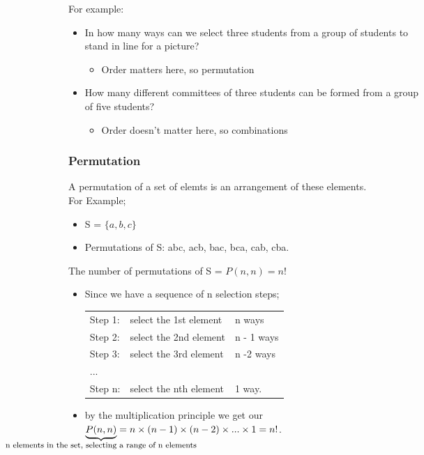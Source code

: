 \documentclass[12pt, letterpaper]{article}
\newcommand{\cul}[1]{%
		\uline{\phantom{#1}}%
		\llap{\contour{white}{#1}}%
	}
\begin{document}
For example: 
\begin{itemize}[leftmargin=*, label={}]
	\item In how many ways  can we select three students from a group of students to stand in line for a picture?
	\begin{itemize}
		\item Order matters here, so permutation
	\end{itemize}
	\item How many different committees of three students can be formed from a group of five students?
	\begin{itemize}
		\item Order doesn't matter here, so combinations
	\end{itemize}
\end{itemize}

\pagebreak

\subsubsection{Permutation}
A permutation of a set of elemts is an \cul{ordered} arrangement of these elements. \\
For Example;
\begin{itemize}[leftmargin=*, label={}]
	\item S = $\{a,b,c\}$
	\item Permutations of S: abc, acb, bac, bca, cab, cba.
\end{itemize}

\bigbreak

The number of permutations of S = $P(n,n) = n!$ 
\begin{itemize}[leftmargin=*, label={}]
	\item Since we have a sequence of n selection steps; \\
	\begin{tabular}{l l l}
		Step 1: & select the 1st element & n ways \\ 
		Step 2: & select the 2nd element & n - 1 ways \\ 
		Step 3: & select the 3rd element & n -2 ways \\
		... & & \\
		Step n: & select the nth element & 1 way. 
	\end{tabular}
	\item by the multiplication principle we get our $\underbrace{P(n,n)}_{\makebox[0pt]{\footnotesize n elements in the set, selecting a range of n elements}} = n \times (n-1) \times (n-2) \times ... \times 1 = n!$.
\end{itemize}
\end{document}
